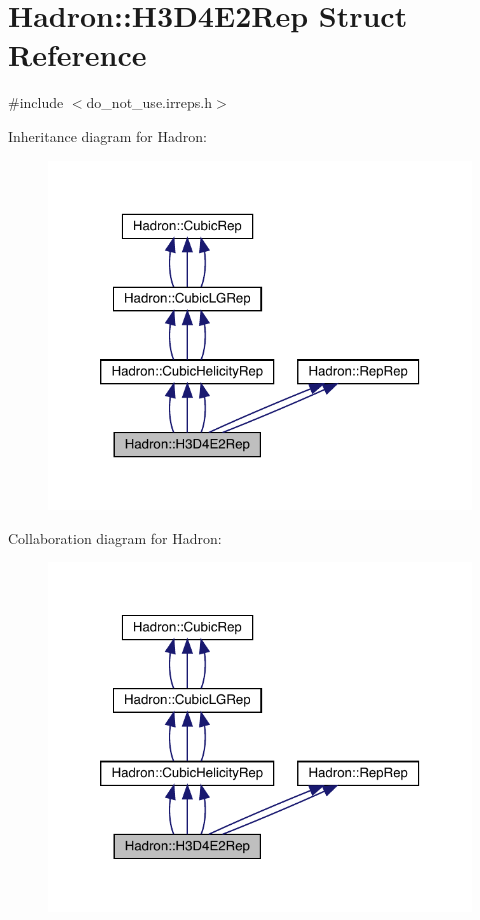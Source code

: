 \hypertarget{structHadron_1_1H3D4E2Rep}{}\section{Hadron\+:\+:H3\+D4\+E2\+Rep Struct Reference}
\label{structHadron_1_1H3D4E2Rep}


{\ttfamily \#include $<$do\+\_\+not\+\_\+use.\+irreps.\+h$>$}



Inheritance diagram for Hadron\+:
\nopagebreak
\begin{figure}[H]
\begin{center}
\leavevmode
\includegraphics[width=320pt]{d0/dde/structHadron_1_1H3D4E2Rep__inherit__graph}
\end{center}
\end{figure}


Collaboration diagram for Hadron\+:
\nopagebreak
\begin{figure}[H]
\begin{center}
\leavevmode
\includegraphics[width=320pt]{d1/d5b/structHadron_1_1H3D4E2Rep__coll__graph}
\end{center}
\end{figure}
